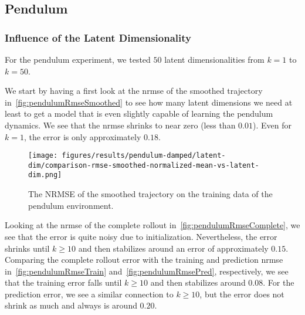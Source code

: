 	\subsection{Pendulum}
		\subsubsection{Influence of the Latent Dimensionality}
			For the pendulum experiment, we tested \(50\) latent dimensionalities from \( k = 1 \) to \( k = 50 \).

			We start by having a first look at the \ac{nrmse} of the smoothed trajectory in~\autoref{fig:pendulumRmseSmoothed} to see how many latent dimensions we need at least to get a model that is even slightly capable of learning the pendulum dynamics. We see that the \ac{nrmse} shrinks to near zero (less than \( 0.01 \)). Even for \( k = 1 \), the error is only approximately \( 0.18 \).

			\begin{figure}
				\centering
				\texttt{[image: figures/results/pendulum-damped/latent-dim/comparison-rmse-smoothed-normalized-mean-vs-latent-dim.png]}
				\caption[Error of the smoothed trajectory on the training data of the pendulum experiment]{The NRMSE of the smoothed trajectory on the training data of the pendulum environment.}
				\label{fig:pendulumRmseSmoothed}
			\end{figure}

			Looking at the \ac{nrmse} of the complete rollout in~\autoref{fig:pendulumRmseComplete}, we see that the error is quite noisy due to initialization. Nevertheless, the error shrinks until \( k \geq 10 \) and then stabilizes around an error of approximately \(0.15\). Comparing the complete rollout error with the training and prediction \ac{nrmse} in~\autoref{fig:pendulumRmseTrain} and~\autoref{fig:pendulumRmsePred}, respectively, we see that the training error falls until \( k \geq 10 \) and then stabilizes around \(0.08\). For the prediction error, we see a similar connection to \( k \geq 10 \), but the error does not shrink as much and always is around \(0.20\).

